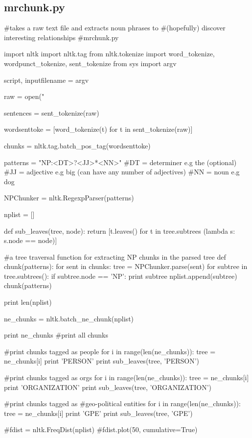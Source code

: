 \subsection{mrchunk.py}
\label{mrchunk.py}
\begin{pyverbatim}
#takes a raw text file and extracts noun phrases to
#(hopefully) discover interesting relationships
#mrchunk.py

import nltk
import nltk.tag
from nltk.tokenize import word_tokenize, wordpunct_tokenize, sent_tokenize
from sys import argv


script, inputfilename = argv

raw = open("%

sentences = sent_tokenize(raw)

wordsenttoke = [word_tokenize(t) for t in sent_tokenize(raw)]

chunks = nltk.tag.batch_pos_tag(wordsenttoke)

patterns =  "NP:{<DT>?<JJ>*<NN>}"
#DT = determiner e.g the (optional)
#JJ = adjective e.g big (can have any number of adjectives)
#NN = noun e.g dog

NPChunker = nltk.RegexpParser(patterns)

nplist = []


def sub_leaves(tree, node):
    return [t.leaves() for t in tree.subtrees
    (lambda s: s.node == node)]

#a tree traversal function for extracting NP chunks in the parsed tree
def chunk(patterns):
    for sent in chunks:
        tree = NPChunker.parse(sent)
        for subtree in tree.subtrees():
            if subtree.node == 'NP':
                print subtree
                nplist.append(subtree)
chunk(patterns)

print len(nplist)

ne_chunks = nltk.batch_ne_chunk(nplist) 

print ne_chunks #print all chunks

#print chunks tagged as people
for i in range(len(ne_chunks)):
    tree = ne_chunks[i]
    print 'PERSON'
    print sub_leaves(tree, 'PERSON')

#print chunks tagged as orgs
for i in range(len(ne_chunks)):
     tree = ne_chunks[i]
     print 'ORGANIZATION' 
     print sub_leaves(tree, 'ORGANIZATION')

#print chunks tagged as 
#geo-political entities 
for i in range(len(ne_chunks)):
     tree = ne_chunks[i]
     print 'GPE' 
     print sub_leaves(tree, 'GPE')

#fdist = nltk.FreqDist(nplist)
#fdist.plot(50, cumulative=True)

\end{pyverbatim}

